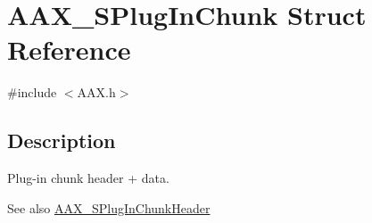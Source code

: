 \hypertarget{a01421}{}\section{A\+A\+X\+\_\+\+S\+Plug\+In\+Chunk Struct Reference}
\label{a01421}


{\ttfamily \#include $<$A\+A\+X.\+h$>$}



\subsection{Description}
Plug-\/in chunk header + data. 

\begin{DoxySeeAlso}{See also}
\mbox{\hyperlink{a01417}{A\+A\+X\+\_\+\+S\+Plug\+In\+Chunk\+Header}} 
\end{DoxySeeAlso}
